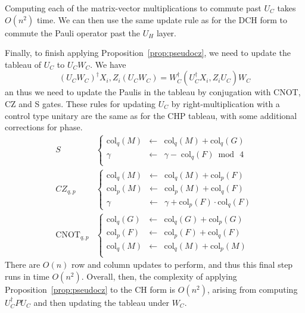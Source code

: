 Computing each of the matrix-vector multiplications to commute past $U_{C}$ takes $O(n^{2})$ time. We can then use the same update rule as for the DCH form to commute the Pauli operator past the $U_{H}$ layer.\par
Finally, to finish applying Proposition~\ref{prop:pseudocz}, we need to update the tableau of $U_{C}$ to $U_{C}W_{C}$. We have
\[\left(U_{C}W_{C}\right)^{\dagger}X_{i},Z_{i}\left(U_{C}W_{C}\right) = W_{C}^{\dagger}\left(U_{C}^{\dagger}X_{i},Z_{i}U_{C}\right)W_{C}\]
an thus we need to update the Paulis in the tableau by conjugation with CNOT, CZ and S gates. These rules for updating $U_{C}$ by right-multiplication with a control type unitary are the same as for the CHP tableau, with some additional corrections for phase.
\begin{align}
S & \left\{
\begin{array}{rcl}
\text{col}_{q}(M)  & \gets & \text{col}_{q}(M)+\text{col}_{q}(G) \\
\gamma & \gets & \gamma - \; \text{col}_{q}(F) \bmod\,4 \\
\end{array}\right. \nonumber \\
CZ_{q,p} & \left\{
\begin{array}{rcl}
\text{col}_{q}(M) & \gets & \text{col}_{q}(M) + \text{col}_{p}(F) \\
\text{col}_{p}(M) & \gets & \text{col}_{p}(M) + \text{col}_{q}(F) \\
\gamma & \gets & \gamma + \text{col}_{p}(F) \cdot \text{col}_{q}(F)
\end{array} \right. \nonumber \\ 
\text{CNOT}_{q,p} & \left\{
\begin{array}{rcl}
\text{col}_{q}(G) & \gets & \text{col}_{q}(G) + \text{col}_{p}(G)\\
\text{col}_{p}(F) & \gets & \text{col}_{p}(F) + \text{col}_{q}(F)\\
\text{col}_{q}(M) & \gets & \text{col}_{q}(M) + \text{col}_{p}(M)\\
\end{array}\right.
\end{align}
There are $O(n)$ row and column updates to perform, and thus this final step runs in time $O(n^{2})$. Overall, then, the complexity of applying Proposition~\ref{prop:pseudocz} to the CH form is $O(n^{2})$, arising from computing $U_{C}^{\dagger}PU_{C}$ and then updating the tableau under $W_{C}$.
